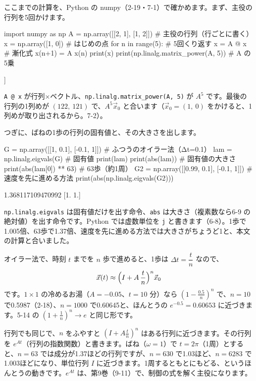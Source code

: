 \label{bk:7-10:python}ここまでの計算を、Python の numpy（2-19・7-1）で確かめます。まず、主役の行列を5回かけます。\par\nobreak
\begin{bkcode}[Python]
import numpy as np
A = np.array([[2, 1], [1, 2]])      \# 主役の行列（行ごとに書く）
x = np.array([1, 0])                \# はじめの点
for n in range(5):                  \# 5回くり返す
    x = A @ x                       \# 漸化式 x(n+1) = A x(n)
    print(x)
print(np.linalg.matrix\_power(A, 5)) \# A の5乗
\end{bkcode}
\begin{bkcodeout}[実行結果]
[2 1]
[5 4]
[14 13]
[41 40]
[122 121]
[[122 121]
 [121 122]]
\end{bkcodeout}
\texttt{A @ x} が行列×ベクトル、\texttt{np.linalg.matrix\_power(A, 5)} が $A^5$ です。最後の行列の1列めが $(122,\ 121)$ で、$A^5\vec x_0$ と合います（$\vec x_0=(1,\ 0)$ をかけると、1列めが取り出されるから。7-2）。

つぎに、ばねの1歩の行列の固有値と、その大きさを出します。\par\nobreak
\begin{bkcode}[Python]
G = np.array([[1, 0.1], [-0.1, 1]])     \# ふつうのオイラー法（Δt=0.1）
lam = np.linalg.eigvals(G)              \# 固有値
print(lam)
print(abs(lam))                         \# 固有値の大きさ
print(abs(lam[0]) ** 63)                \# 63歩（約1周）
G2 = np.array([[0.99, 0.1], [-0.1, 1]]) \# 速度を先に進める方法
print(abs(np.linalg.eigvals(G2)))
\end{bkcode}
\begin{bkcodeout}[実行結果]
[1.+0.1j 1.-0.1j]
[1.00498756 1.00498756]
1.368117109470992
[1. 1.]
\end{bkcodeout}
\texttt{np.linalg.eigvals} は固有値だけを出す命令、\texttt{abs} は大きさ（複素数なら6-9 の絶対値）を出す命令です。Python では虚数単位を \texttt{j} と書きます（6-8）。1歩で1.005倍、63歩で1.37倍、速度を先に進める方法では大きさがちょうど1と、本文の計算と合いました。

\begin{motto}[5]
オイラー法で、時刻 $t$ までを $n$ 歩で進めると、1歩は $\Delta t=\dfrac{t}{n}$ なので、
\[ \vec x(t)\approx\Bigl(I+A\,\frac{t}{n}\Bigr)^n\vec x_0 \]
です。$1\times1$ の冷めるお湯（$A=-0.05$、$t=10$ 分）なら $\left(1-\frac{0.5}{n}\right)^n$ で、$n=10$ で0.5987（2-18）、$n=1000$ で0.60645と、ほんとうの $e^{-0.5}=0.60653$ に近づきます。5-14 の $\left(1+\frac{1}{n}\right)^n\to e$ と同じ形です。

行列でも同じで、$n$ をふやすと $\left(I+A\frac{t}{n}\right)^n$ はある行列に近づきます。その行列を $e^{At}$（行列の指数関数）と書きます。ばね（$\omega=1$）で $t=2\pi$（1周）とすると、$n=63$ では成分が1.37ほどの行列ですが、$n=630$ で1.03ほど、$n=6283$ で1.003ほどになり、単位行列 $I$ に近づきます。1周するともとにもどる、というほんとうの動きです。$e^{At}$ は、第9巻（9-11）で、制御の式を解く主役になります。
\end{motto}

